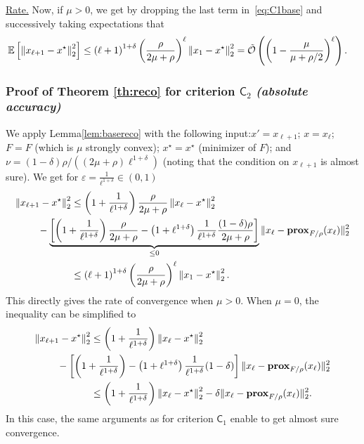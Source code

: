      \vspace*{1ex}
     \noindent\underline{Rate.} Now, if $\mu>0$, we get by dropping the last term in~\eqref{eq:C1base} and successively taking expectations that  
      \begin{align}
        \mathbb{E} \left[   \left\|x_{\ell+1} - x^\star  \right\|^2_2 \right] &\leq \left( {\ell} + 1  \right)^{1+\delta}  \left( \frac{{\rho }}{2\mu + {\rho }} \right)^\ell  \left\| x_1 - x^\star \right\|^2_2 
        = \tilde{\mathcal{O}} \left( \left( 1 - \frac{{\mu }}{\mu + {\rho }/2} \right)^\ell \right).
     \end{align}

\subsubsection{Proof of Theorem \ref{th:reco} for criterion  $\mathsf{C}_2$ \emph{(absolute accuracy)}}
We apply Lemma\;\ref{lem:basereco} with the following input:\;$x'\!= x_{\ell+1}$; $x = x_\ell$; $F = F$ (which is $\mu$ strongly convex); $x^\star =x^\star$ (minimizer of $F$); 
and $ \nu = (1-\delta)\rho/((2\mu+\rho)\ell^{1+\delta})$ (noting that the condition on $x_{\ell+1}$ is almost sure). We get for $\varepsilon = \frac{1}{\ell^{1+\delta}} \in (0,1)$
        \begin{align*}
  \left\|x_{\ell+1} - x^\star  \right\|^2_2 &\leq \left( 1 + \frac{1}{\ell^{1+\delta}} \right)  \frac{{\rho }}{2\mu + {\rho }}  \left\| x_\ell - x^\star \right\|^2_2 \\
   \nonumber     &\hspace*{-1.2cm} - \underbrace{\left[ \left(1 + \frac{1}{\ell^{1+\delta}}\right) \frac{{\rho }}{2\mu + {\rho }}  - \left( 1 + \ell^{1+\delta} \right)  \frac{1}{\ell^{1+\delta}}  \frac{{(1-\delta)\rho }}{2\mu + {\rho }} \right]}_{\leq 0}  \|x_\ell -  \prox_{F/{\rho }}(x_\ell)   \|^2_2 \\
 \nonumber  &\leq  \left( {\ell} + 1  \right)^{1+\delta}  \left( \frac{{\rho }}{2\mu + {\rho }} \right)^\ell  \left\| x_1 - x^\star \right\|^2_2 .
     \end{align*}
     This directly gives the rate of convergence when $\mu>0$. 
    When $\mu=0$, the inequality can be simplified to
    \begin{align}
  \nonumber \left\|x_{\ell+1} - x^\star  \right\|^2_2 &\leq \left( 1 + \frac{1}{\ell^{1+\delta}} \right)    \left\| x_\ell - x^\star \right\|^2_2 \\
   \nonumber     &\hspace*{-1.2cm} -  \left[ \left(1 + \frac{1}{\ell^{1+\delta}}\right)   - \left( 1 + \ell^{1+\delta} \right)  \frac{1}{\ell^{1+\delta}}  (1-\delta) \right]  \|x_\ell -  \prox_{F/{\rho }}(x_\ell)   \|^2_2 \\
\nonumber  &\leq \left( 1 + \frac{1}{\ell^{1+\delta}} \right)    \left\| x_\ell - x^\star \right\|^2_2 - \delta  \|x_\ell -  \prox_{F/{\rho }}(x_\ell)   \|^2_2.
     \end{align}
     In this case, the same arguments as for criterion $\mathsf{C}_1$ enable to get almost sure convergence.
